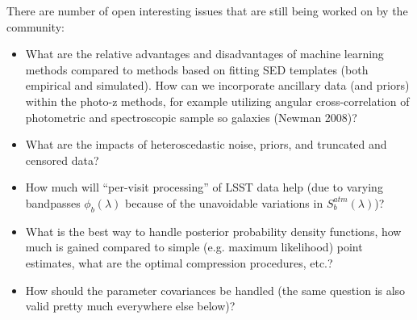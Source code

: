 \documentclass{iau}
\begin{document}
There are number of open interesting issues that are still being worked on by the community: 
\begin{itemize}
\item What are the relative advantages and disadvantages of machine
  learning methods compared to methods based on fitting
          SED templates (both empirical and simulated). How can we
          incorporate ancillary data (and priors) within the photo-z
          methods, for example utilizing angular cross-correlation of 
         photometric and spectroscopic sample so galaxies (Newman 2008)? 
\item What are the impacts of heteroscedastic noise, priors, and truncated and censored data? 
\item How much will ``per-visit processing'' of LSST data help (due to varying bandpasses $\phi_b(\lambda)$ 
          because of the unavoidable variations in $S_b^{atm}(\lambda)$)? 
\item What is the best way to handle posterior probability density functions, how much is gained compared 
         to simple (e.g. maximum likelihood) point estimates, what are the optimal compression procedures, etc.?  
\item How should the parameter covariances be handled (the same question is also valid pretty much everywhere 
          else below)? 
\end{itemize}




\end{document}
